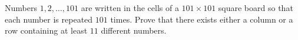 Numbers $1, 2,\dots , 101$ are written in the cells of a $101\times 101$ square board so that each number is repeated $101$ times. Prove that there exists either a column or a row containing at least $11$ different numbers.